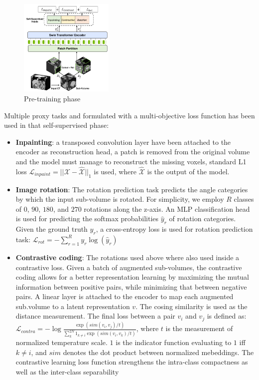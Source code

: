 \begin{figure}[ht!]
  \centering
  \includegraphics[width=0.4\textwidth]{Images/pretrain-unetr.png}
  \caption{Pre-training phase}
  \label{fig:pretrain-unetr}
\end{figure}
Multiple proxy tasks and formulated with a multi-objective loss function has been used in that self-supervised phase:
\begin{itemize}
  \item{\textbf{Inpainting}: a transposed convolution layer have been attached
    to the encoder as reconstruction head, a patch is removed from the original
    volume and the model must manage to reconstruct the missing voxels, standard
    L1 loss $\mathcal{L}_{inpaint} = ||\mathcal{X} - \hat{\mathcal{X}}||_1$ is used, where $\hat{\mathcal{X}}$
    is the output of the model.}
  \item{\textbf{Image rotation}: The rotation prediction task predicts the angle categories
  by which the input sub-volume is rotated. For simplicity, we employ $R$ classes
    of $0$, $90$, $180$, and $270$ rotations along the z-axis. An MLP
    classification head is used for predicting the softmax probabilities
    $\hat{y}_r$ of rotation categories. Given the ground truth $y_r$, a
    cross-entropy loss is used for rotation prediction task: $\mathcal{L}_{rot} = -\sum^R_{r=1}y_r\log(\hat{y}_r)$}
  \item{\textbf{Contrastive coding}: The rotations used above where also used
    inside a contrastive loss. Given a batch of augmented sub-volumes, the
    contrastive coding allows for a better representation learning by maximizing
    the mutual information between positive pairs, while minimizing that between
    negative pairs. A linear layer is attached to the encoder to map each
    augmented sub.volume to a latent representation $v$. The cosing similarity
    is used as the distance measurement. The final loss between a pair $v_i$ and
    $v_j$ is defined as: $\mathcal{L}_{contra} =
    -\log{\frac{\exp{(sim(v_i,v_j)/t)}}{\sum_k^{2N}1_{k \neq
    i}\exp{(sim(v_i,v_k)/t)}}}$, where $t$ is the measurement of normalized
    temperature scale. $1$ is the indicator function evaluating to $1$ iff $k
    \neq i$, and $sim$ denotes the dot product between normalized mebeddings.
    The contrastive learning loss function strengthens the intra-class
    compactness as well as the inter-class separability}
\end{itemize}

